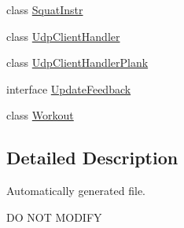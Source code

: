 \begin{DoxyCompactItemize}
class \mbox{\hyperlink{classcom_1_1example_1_1trainawearapplication_1_1_squat_instr}{Squat\+Instr}}
\item 
class \mbox{\hyperlink{classcom_1_1example_1_1trainawearapplication_1_1_udp_client_handler}{Udp\+Client\+Handler}}
\item 
class \mbox{\hyperlink{classcom_1_1example_1_1trainawearapplication_1_1_udp_client_handler_plank}{Udp\+Client\+Handler\+Plank}}
\item 
interface \mbox{\hyperlink{interfacecom_1_1example_1_1trainawearapplication_1_1_update_feedback}{Update\+Feedback}}
\item 
class \mbox{\hyperlink{classcom_1_1example_1_1trainawearapplication_1_1_workout}{Workout}}
\end{DoxyCompactItemize}


\subsection{Detailed Description}
Automatically generated file. 

DO N\+OT M\+O\+D\+I\+FY 